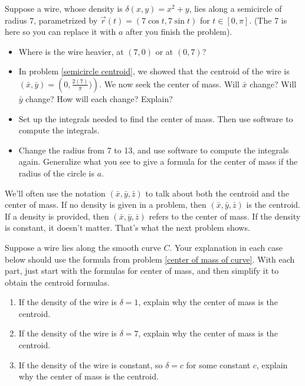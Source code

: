 \begin{problem}
Suppose a wire, whose density is $\delta(x,y)=x^2+y$, lies along a semicircle of radius $7$, parametrized by $\vec r(t) = (7\cos t, 7\sin t)$ for $t\in[0,\pi]$. (The 7 is here so you can replace it with $a$ after you finish the problem).
\begin{itemize}
 \item Where is the wire heavier, at $(7,0)$ or at $(0,7)$?
 \item In problem \ref{semicircle centroid}, we showed that the centroid of the wire is $(\bar x, \bar y) = \left(0,\frac{2(7)}{\pi})\right)$.  We now seek the center of mass. Will $\bar x$ change?  Will $\bar y$ change?  How will each change? Explain?
 \item Set up the integrals needed to find the center of mass. Then use software to compute the integrals.
 \item Change the radius from 7 to 13, and use software to compute the integrals again.  Generalize what you see to give a formula for the center of mass if the radius of the circle is $a$.
\end{itemize}
\end{problem}


We'll often use the notation $(\bar x, \bar y,\bar z)$ to talk about both the centroid and the center of mass. If no density is given in a problem, then $(\bar x, \bar y,\bar z)$ is the centroid. If a density is provided, then $(\bar x, \bar y,\bar z)$ refers to the center of mass. If the density is constant, it doesn't matter. That's what the next problem shows.

\begin{problem}
 Suppose a wire lies along the smooth curve $C$. Your explanation in each case below should use the formula from problem \ref{center of mass of curve}. With each part, just start with the formulas for center of mass, and then simplify it to obtain the centroid formulas.
\begin{enumerate}
 \item If the density of the wire is $\delta =1$, explain why the center of mass is the centroid. 
 \item If the density of the wire is $\delta =7$, explain why the center of mass is the centroid.
 \item If the density of the wire is constant, so $\delta =c$ for some constant $c$, explain why the center of mass is the centroid.
\end{enumerate}
\end{problem}

